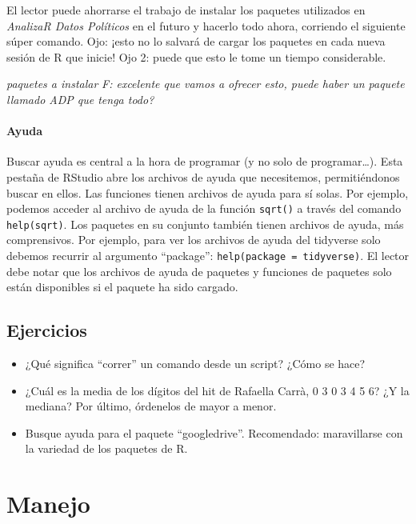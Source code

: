 \documentclass[]{book}
\providecommand{\tightlist}{%
  \setlength{\itemsep}{0pt}\setlength{\parskip}{0pt}}
\begin{document}
El lector puede ahorrarse el trabajo de instalar los paquetes utilizados
en \emph{AnalizaR Datos Políticos} en el futuro y hacerlo todo ahora,
corriendo el siguiente súper comando. Ojo: ¡esto no lo salvará de cargar
los paquetes en cada nueva sesión de R que inicie! Ojo 2: puede que esto
le tome un tiempo considerable.

\emph{paquetes a instalar} \emph{F: excelente que vamos a ofrecer esto,
puede haber un paquete llamado ADP que tenga todo?}

\subsubsection{Ayuda}\label{ayuda}

Buscar ayuda es central a la hora de programar (y no solo de
programar\ldots{}). Esta pestaña de RStudio abre los archivos de ayuda
que necesitemos, permitiéndonos buscar en ellos. Las funciones tienen
archivos de ayuda para sí solas. Por ejemplo, podemos acceder al archivo
de ayuda de la función \texttt{sqrt()} a través del comando
\texttt{help(sqrt)}. Los paquetes en su conjunto también tienen archivos
de ayuda, más comprensivos. Por ejemplo, para ver los archivos de ayuda
del tidyverse solo debemos recurrir al argumento ``package'':
\texttt{help(package\ =\ tidyverse)}. El lector debe notar que los
archivos de ayuda de paquetes y funciones de paquetes solo están
disponibles si el paquete ha sido cargado.

\section{Ejercicios}\label{ejercicios}

\begin{itemize}
\tightlist
\item
  ¿Qué significa ``correr'' un comando desde un script? ¿Cómo se hace?
\item
  ¿Cuál es la media de los dígitos del hit de Rafaella Carrà, 0 3 0 3 4
  5 6? ¿Y la mediana? Por último, órdenelos de mayor a menor.
\item
  Busque ayuda para el paquete ``googledrive''. Recomendado:
  maravillarse con la variedad de los paquetes de R.
\end{itemize}

\chapter{Manejo}\label{manejo}
\end{document}

